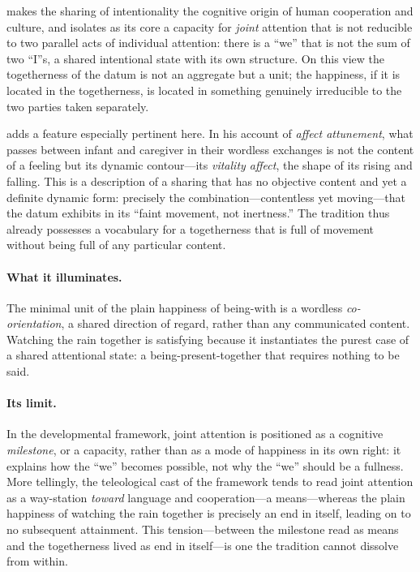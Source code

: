 \textcite{tomasello2008} makes the sharing of intentionality the cognitive origin of human cooperation and culture, and isolates as its core a capacity for \emph{joint} attention that is not reducible to two parallel acts of individual attention: there is a ``we'' that is not the sum of two ``I''s, a shared intentional state with its own structure. On this view the togetherness of the datum is not an aggregate but a unit; the happiness, if it is located in the togetherness, is located in something genuinely irreducible to the two parties taken separately.

\textcite{stern1985} adds a feature especially pertinent here. In his account of \emph{affect attunement}, what passes between infant and caregiver in their wordless exchanges is not the content of a feeling but its dynamic contour---its \emph{vitality affect}, the shape of its rising and falling. This is a description of a sharing that has no objective content and yet a definite dynamic form: precisely the combination---contentless yet moving---that the datum exhibits in its ``faint movement, not inertness.'' The tradition thus already possesses a vocabulary for a togetherness that is full of movement without being full of any particular content.

\paragraph{What it illuminates.} The minimal unit of the plain happiness of being-with is a wordless \emph{co-orientation}, a shared direction of regard, rather than any communicated content. Watching the rain together is satisfying because it instantiates the purest case of a shared attentional state: a being-present-together that requires nothing to be said.

\paragraph{Its limit.} In the developmental framework, joint attention is positioned as a cognitive \emph{milestone}, or a capacity, rather than as a mode of happiness in its own right: it explains how the ``we'' becomes possible, not why the ``we'' should be a fullness. More tellingly, the teleological cast of the framework tends to read joint attention as a way-station \emph{toward} language and cooperation---a means---whereas the plain happiness of watching the rain together is precisely an end in itself, leading on to no subsequent attainment. This tension---between the milestone read as means and the togetherness lived as end in itself---is one the tradition cannot dissolve from within.

